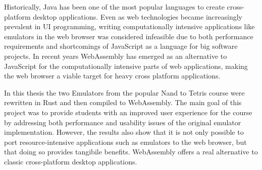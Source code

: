 Historically, Java has been one of the most popular languages to create cross-platform desktop applications.
Even as web technologies became increasingly prevalent in UI programming, writing computationally intensive applications like emulators in the web browser was considered infeasible due to both performance requirements and shortcomings of JavaScript as a language for big software projects.
In recent years WebAssembly has emerged as an alternative to JavaScript for the computationally intensive parts of web applications, making the web browser a viable target for heavy cross platform applications.

In this thesis the two Emulators from the popular Nand to Tetris course were rewritten in Rust and then compiled to WebAssembly.
The main goal of this project was to provide students with an improved user experience for the course by addressing both performance and usability issues of the original emulator implementation. However, the results also show that it is not only possible to port resource-intensive applications such as emulators to the web browser, but that doing so provides tangibile benefits. WebAssembly offers a real alternative to classic cross-platform desktop applications.
